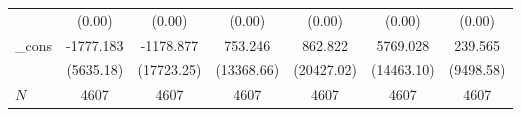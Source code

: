 {\begin{tabular}{l*{6}{c}}
            &                   (0.00)         &                   (0.00)         &                   (0.00)         &                   (0.00)         &                   (0.00)         &                   (0.00)         \\
\_cons      &                -1777.183         &                -1178.877         &                  753.246         &                  862.822         &                 5769.028         &                  239.565         \\
            &                (5635.18)         &               (17723.25)         &               (13368.66)         &               (20427.02)         &               (14463.10)         &                (9498.58)         \\
\hline
\(N\)       &                     4607         &                     4607         &                     4607         &                     4607         &                     4607         &                     4607         \\
\hline\hline
\end{tabular}
}
